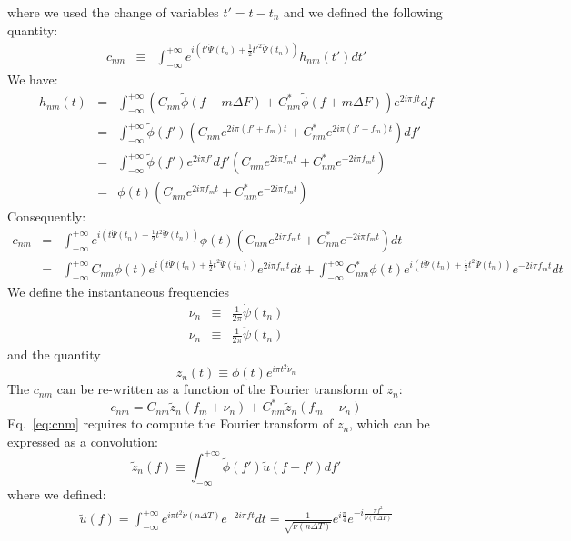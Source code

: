 \documentclass{article}
\begin{document}
where we used the change of variables $t'=t-t_n$ and we defined the following quantity:
\begin{eqnarray}
    c_{nm} & \equiv & \int_{-\infty}^{+\infty} e^{i\left(t'\dot{\Psi}(t_n) + \frac{1}{2} {t'}^2 \ddot{\Psi}(t_n) \right)} h_{nm}(t') dt'
\end{eqnarray}
We have:
\begin{eqnarray*}
    h_{nm}(t) &=& \int_{-\infty}^{+\infty} \left(C_{nm}\tilde\phi(f-m\Delta F)+C^*_{nm}\tilde\phi(f+m\Delta F) \right) e^{2i \pi f t} df \\
    &=& \int_{-\infty}^{+\infty} \tilde\phi(f') \left( C_{nm}e^{2i \pi (f'+f_m) t}+C^*_{nm} e^{2i \pi (f'-f_m)t } \right)  df' \\
    & = &  \int_{-\infty}^{+\infty} \tilde\phi(f')  e^{2i \pi f'} df' \left( C_{nm}e^{2i \pi f_m t}+C^*_{nm} e^{-2i \pi f_m t } \right)  \\
    & = & \phi(t) \left( C_{nm}e^{2i \pi f_m t}+C^*_{nm} e^{-2i \pi f_m t } \right)
\end{eqnarray*}
Consequently:
\begin{eqnarray*}
    c_{nm} & = & \int_{-\infty}^{+\infty} e^{i\left(t\dot{\Psi}(t_n) + \frac{1}{2} {t}^2 \ddot{\Psi}(t_n) \right)} \phi(t) \left( C_{nm}e^{2i \pi f_m t}+C^*_{nm} e^{-2i \pi f_m t }\right) dt \\
    & = & \int_{-\infty}^{+\infty} C_{nm}\phi(t) e^{i\left(t\dot{\Psi}(t_n) + \frac{1}{2} {t}^2 \ddot{\Psi}(t_n) \right)} e^{2i \pi f_m t } dt + \int_{-\infty}^{+\infty} C^\ast_{nm} \phi(t) e^{i\left(t\dot{\Psi}(t_n) + \frac{1}{2} {t}^2 \ddot{\Psi}(t_n) \right)} e^{-2i \pi f_m t } dt
\end{eqnarray*}
We define the instantaneous frequencies
\begin{eqnarray}
\label{eq:nu-def}
    \nu_n & \equiv & \frac{1}{2 \pi} \dot{\psi}(t_n) \\
    \dot{\nu}_n & \equiv & \frac{1}{2 \pi} \ddot{\psi}(t_n)
\end{eqnarray}
and the quantity 
\begin{equation}
\label{eq:zn-def}
\boxed{z_n(t) \equiv \phi(t) e^{i \pi t^2 \dot{\nu}_n}}
\end{equation}
The $c_{nm}$ can be re-written as a function of the Fourier transform of $z_n$:
\begin{equation}
\label{eq:cnm}
\boxed{
    c_{nm}  =  C_{nm} \tilde{z}_{n}\left(f_m + \nu_n\right) + C^\ast_{nm} \tilde{z}_{n}\left(f_m - \nu_n\right)
    }
\end{equation}
Eq.~\eqref{eq:cnm} requires to compute the Fourier transform of $z_{n}$, which can be expressed as a convolution:
\begin{equation}
    \tilde{z}_{n}(f) \equiv \int_{-\infty}^{+\infty} \tilde{\phi}(f') \tilde{u}(f-f') df'
\end{equation}
where we defined:
\begin{eqnarray}
  \tilde{u}(f) = \int_{-\infty}^{+\infty} e^{i \pi  t^2 \dot{\nu}(n\Delta T)} e^{-2 i \pi f t} dt = \frac{1}{\sqrt{\dot{\nu}(n\Delta T)}} e^{i \frac{\pi}{4}} e^{-i \frac{\pi f^2}{\dot{\nu}(n\Delta T)}}
\end{eqnarray}
\end{document}
